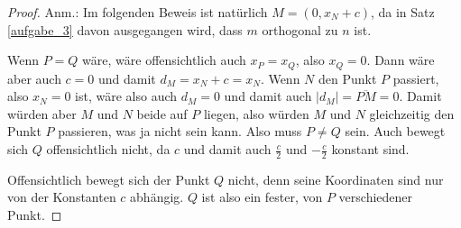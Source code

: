 \begin{proof}
    \renewcommand{\qedsymbol}{$\square$}
    Anm.: Im folgenden Beweis ist natürlich $M=(0, x_N+c)$, da in Satz \ref{aufgabe_3} davon ausgegangen wird, dass 
    $m$ orthogonal zu $n$ ist.

    Wenn $P=Q$ wäre, wäre offensichtlich auch $x_P=x_Q$, also $x_Q=0$. Dann wäre aber auch $c=0$ und damit $d_M
    =x_N+c=x_N$. Wenn $N$ den Punkt $P$ passiert, also $x_N=0$ ist, wäre also auch $d_M=0$ und damit auch $|d_M|
    =\overline{PM}=0$. Damit  würden aber $M$ und $N$ beide auf $P$ liegen, also würden $M$ und $N$ gleichzeitig 
    den Punkt $P$ passieren, was ja nicht sein kann. Also muss $P\neq Q$ sein. Auch bewegt sich $Q$ offensichtlich 
    nicht, da $c$ und damit auch $\frac{c}{2}$ und $-\frac{c}{2}$ konstant sind.

    Offensichtlich bewegt sich der Punkt $Q$ nicht, denn seine Koordinaten sind nur von der Konstanten $c$ abhängig. 
    $Q$ ist also ein fester, von $P$ verschiedener Punkt.
    

\end{proof}
